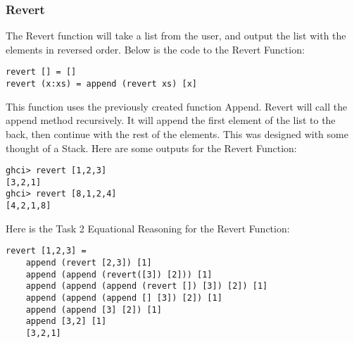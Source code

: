\documentclass{article}
\theoremstyle{theorem}
\theoremstyle{definition}
\theoremstyle{remark}
\begin{document}
\subsubsection{Revert}
The Revert function will take a list from the user, and output the list with the elements in reversed order. \newline
\newline Below is the code to the Revert Function:
\begin{verbatim}
revert [] = []
revert (x:xs) = append (revert xs) [x]
\end{verbatim}
This function uses the previously created function Append. Revert will call the append method recursively. It will append the first element of the list to the back, then continue with the rest of the elements. This was designed with some thought of a Stack. 
\newline Here are some outputs for the Revert Function:
\begin{verbatim}
ghci> revert [1,2,3]
[3,2,1]
ghci> revert [8,1,2,4]
[4,2,1,8]
\end{verbatim}

\noindent\newline\newline Here is the Task 2 Equational Reasoning for the Revert Function:
\begin{verbatim}
revert [1,2,3] = 
    append (revert [2,3]) [1]
    append (append (revert([3]) [2])) [1]
    append (append (append (revert []) [3]) [2]) [1]
    append (append (append [] [3]) [2]) [1]
    append (append [3] [2]) [1]
    append [3,2] [1]
    [3,2,1]
\end{verbatim}
\end{document}
